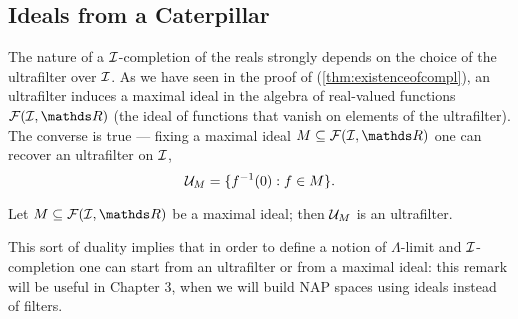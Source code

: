 \documentclass[draft.tex]{subfiles}
\begin{document}
\subsection{Ideals from a Caterpillar}
\label{subs:ideals}
The nature of a $\mathcal{I}$-completion of the reals strongly depends on the choice of the ultrafilter over $\mathcal{I}$. As we have seen in the proof of (\ref{thm:existenceofcompl}), an ultrafilter induces a maximal ideal in the algebra of real-valued functions $\cl{F}(\cl{I},\RR)$ (the ideal of functions that vanish on elements of the ultrafilter). The converse is true --- fixing a maximal ideal $M \subseteq \cl{F}(\cl{I},\RR)$ one can recover an ultrafilter on $\mathcal{I}$,
\begin{equation*}
    \mathcal{U}_{M} = \{f^{-1}(0): f \in M\}.
\end{equation*}
\begin{theorem}
Let $M \subseteq \cl{F}(\cl{I}, \RR)$ be a maximal ideal; then $\mathcal{U}_{M}$ is an ultrafilter.
\end{theorem}
\par This sort of duality implies that in order to define a notion of $\Lambda$-limit and $\mathcal{I}$-completion one can start from an ultrafilter or from a maximal ideal: this remark will be useful in Chapter 3, when we will build NAP spaces using ideals instead of filters.
\end{document}
